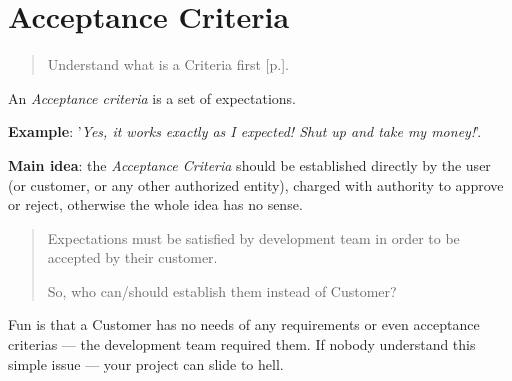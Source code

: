 \section{Acceptance Criteria}
\label{sec:Acceptance Criteria}

\begin{quote}
Understand what is a Criteria first [p.\pageref{sec:Criteria}].
\end{quote} 

An \emph{Acceptance criteria} is a set of expectations.

\textbf{Example}: '\textit{Yes, it works exactly as I expected! Shut up and take my money!}'.

\textbf{Main idea}: the \emph{Acceptance Criteria} should be established directly by the user (or customer, or any other authorized entity), charged with authority to approve or reject, otherwise the whole idea has no sense. \begin{quote}
Expectations must be satisfied by development team in order to be accepted by their customer. 

So, who can/should establish them instead of Customer?\end{quote}

Fun is that a Customer has no needs of any requirements or even acceptance criterias — the development team required them. If nobody understand this simple issue — your project can slide to hell.